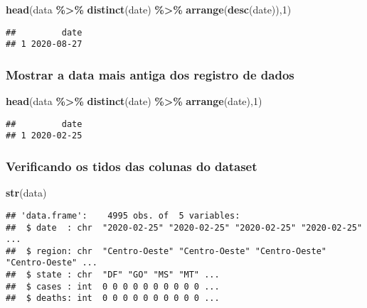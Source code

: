 \documentclass[
]{article}
\newenvironment{Shaded}{\begin{snugshade}}{\end{snugshade}}
\newcommand{\DecValTok}[1]{\textcolor[rgb]{0.00,0.00,0.81}{#1}}
\newcommand{\KeywordTok}[1]{\textcolor[rgb]{0.13,0.29,0.53}{\textbf{#1}}}
\newcommand{\NormalTok}[1]{#1}
\newcommand{\OperatorTok}[1]{\textcolor[rgb]{0.81,0.36,0.00}{\textbf{#1}}}
\newcommand{\StringTok}[1]{\textcolor[rgb]{0.31,0.60,0.02}{#1}}
\begin{document}
\begin{Shaded}
\begin{Highlighting}[]
\KeywordTok{head}\NormalTok{(data }\OperatorTok{\%\textgreater{}\%}\StringTok{ }\KeywordTok{distinct}\NormalTok{(date) }\OperatorTok{\%\textgreater{}\%}\StringTok{ }\KeywordTok{arrange}\NormalTok{(}\KeywordTok{desc}\NormalTok{(date)),}\DecValTok{1}\NormalTok{)}
\end{Highlighting}
\end{Shaded}

\begin{verbatim}
##         date
## 1 2020-08-27
\end{verbatim}

\hypertarget{mostrar-a-data-mais-antiga-dos-registro-de-dados}{%
\subsubsection{Mostrar a data mais antiga dos registro de
dados}\label{mostrar-a-data-mais-antiga-dos-registro-de-dados}}

\begin{Shaded}
\begin{Highlighting}[]
\KeywordTok{head}\NormalTok{(data }\OperatorTok{\%\textgreater{}\%}\StringTok{ }\KeywordTok{distinct}\NormalTok{(date) }\OperatorTok{\%\textgreater{}\%}\StringTok{ }\KeywordTok{arrange}\NormalTok{(date),}\DecValTok{1}\NormalTok{)}
\end{Highlighting}
\end{Shaded}

\begin{verbatim}
##         date
## 1 2020-02-25
\end{verbatim}

\hypertarget{verificando-os-tidos-das-colunas-do-dataset}{%
\subsubsection{Verificando os tidos das colunas do
dataset}\label{verificando-os-tidos-das-colunas-do-dataset}}

\begin{Shaded}
\begin{Highlighting}[]
\KeywordTok{str}\NormalTok{(data)}
\end{Highlighting}
\end{Shaded}

\begin{verbatim}
## 'data.frame':    4995 obs. of  5 variables:
##  $ date  : chr  "2020-02-25" "2020-02-25" "2020-02-25" "2020-02-25" ...
##  $ region: chr  "Centro-Oeste" "Centro-Oeste" "Centro-Oeste" "Centro-Oeste" ...
##  $ state : chr  "DF" "GO" "MS" "MT" ...
##  $ cases : int  0 0 0 0 0 0 0 0 0 0 ...
##  $ deaths: int  0 0 0 0 0 0 0 0 0 0 ...
\end{verbatim}
\end{document}

